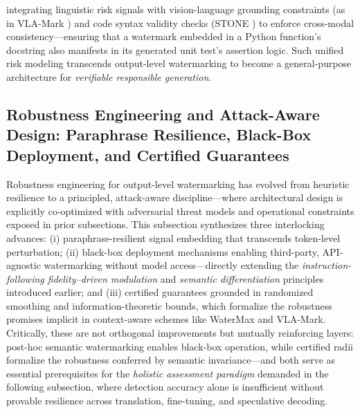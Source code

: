 \documentclass[11pt,a4paper]{article}
\begin{document}
integrating linguistic risk signals with vision-language grounding constraints (as in VLA-Mark \cite{arxiv:2406.03728}) and code syntax validity checks (STONE \cite{arxiv:2502.18851}) to enforce cross-modal consistency---ensuring that a watermark embedded in a Python function's docstring also manifests in its generated unit test's assertion logic. Such unified risk modeling transcends output-level watermarking to become a general-purpose architecture for \emph{verifiable responsible generation}.


\subsection{Robustness Engineering and Attack-Aware Design: Paraphrase Resilience, Black-Box Deployment, and Certified Guarantees}


Robustness engineering for output-level watermarking has evolved from heuristic resilience to a principled, attack-aware discipline---where architectural design is explicitly co-optimized with adversarial threat models and operational constraints exposed in prior subsections. This subsection synthesizes three interlocking advances: (i) paraphrase-resilient signal embedding that transcends token-level perturbation; (ii) black-box deployment mechanisms enabling third-party, API-agnostic watermarking without model access---directly extending the \emph{instruction-following fidelity--driven modulation} and \emph{semantic differentiation} principles introduced earlier; and (iii) certified guarantees grounded in randomized smoothing and information-theoretic bounds, which formalize the robustness promises implicit in context-aware schemes like WaterMax and VLA-Mark. Critically, these are not orthogonal improvements but mutually reinforcing layers: post-hoc semantic watermarking enables black-box operation, while certified radii formalize the robustness conferred by semantic invariance---and both serve as essential prerequisites for the \emph{holistic assessment paradigm} demanded in the following subsection, where detection accuracy alone is insufficient without provable resilience across translation, fine-tuning, and speculative decoding.
\end{document}
